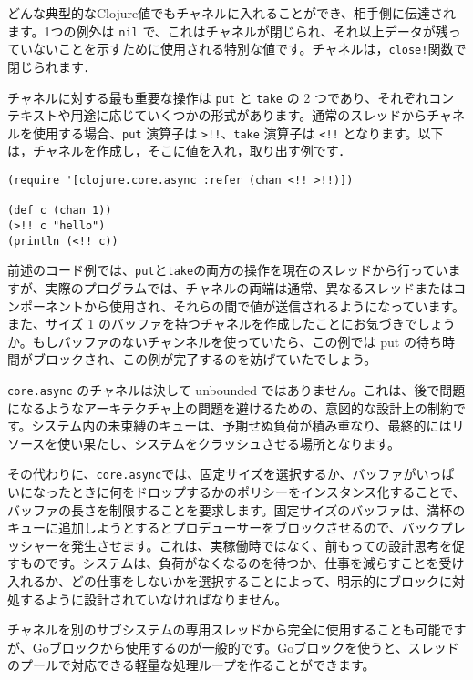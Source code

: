 どんな典型的なClojure値でもチャネルに入れることができ、相手側に伝達されます。1つの例外は \texttt{nil} で、これはチャネルが閉じられ、それ以上データが残っていないことを示すために使用される特別な値です。チャネルは，\texttt{close!}関数で閉じられます．

チャネルに対する最も重要な操作は \texttt{put} と \texttt{take} の 2 つであり、それぞれコンテキストや用途に応じていくつかの形式があります。通常のスレッドからチャネルを使用する場合、\texttt{put} 演算子は \texttt{>!!}、\texttt{take} 演算子は \texttt{<!!} となります。以下は，チャネルを作成し，そこに値を入れ，取り出す例です．

\begin{lstlisting}[numbers=none]
(require '[clojure.core.async :refer (chan <!! >!!)])

(def c (chan 1))
(>!! c "hello")
(println (<!! c))
\end{lstlisting}

前述のコード例では、\texttt{put}と\texttt{take}の両方の操作を現在のスレッドから行っていますが、実際のプログラムでは、チャネルの両端は通常、異なるスレッドまたはコンポーネントから使用され、それらの間で値が送信されるようになっています。また、サイズ 1 のバッファを持つチャネルを作成したことにお気づきでしょうか。もしバッファのないチャンネルを使っていたら、この例では put の待ち時間がブロックされ、この例が完了するのを妨げていたでしょう。

\texttt{core.async} のチャネルは決して unbounded ではありません。これは、後で問題になるようなアーキテクチャ上の問題を避けるための、意図的な設計上の制約です。システム内の未束縛のキューは、予期せぬ負荷が積み重なり、最終的にはリソースを使い果たし、システムをクラッシュさせる場所となります。

その代わりに、\texttt{core.async}では、固定サイズを選択するか、バッファがいっぱいになったときに何をドロップするかのポリシーをインスタンス化することで、バッファの長さを制限することを要求します。固定サイズのバッファは、満杯のキューに追加しようとするとプロデューサーをブロックさせるので、バックプレッシャーを発生させます。これは、実稼働時ではなく、前もっての設計思考を促すものです。システムは、負荷がなくなるのを待つか、仕事を減らすことを受け入れるか、どの仕事をしないかを選択することによって、明示的にブロックに対処するように設計されていなければなりません。

チャネルを別のサブシステムの専用スレッドから完全に使用することも可能ですが、Goブロックから使用するのが一般的です。Goブロックを使うと、スレッドのプールで対応できる軽量な処理ループを作ることができます。

